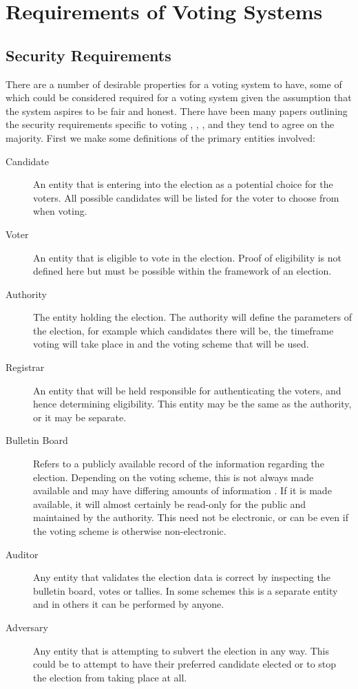 
\chapter{Requirements of Voting Systems}
\label{ch:req}

\section{Security Requirements}
\label{ch:req:sec}

There are a number of desirable properties for a voting system to have, some of which could be considered required for a voting system given the assumption that the system aspires to be fair and honest. There have been many papers outlining the security requirements specific to voting \cite{epstein_electronic_2007}, \cite{delaune_formalising_nodate}, \cite{li_taxonomy_2014}, and they tend to agree on the majority. First we make some definitions of the primary entities involved:

\begin{description}
    \item[Candidate] An entity that is entering into the election as a potential choice for the voters. All possible candidates will be listed for the voter to choose from when voting.
    \item[Voter] An entity that is eligible to vote in the election. Proof of eligibility is not defined here but must be possible within the framework of an election.
    \item[Authority] The entity holding the election. The authority will define the parameters of the election, for example which candidates there will be, the timeframe voting will take place in and the voting scheme that will be used.
    \item[Registrar] An entity that will be held responsible for authenticating the voters, and hence determining eligibility. This entity may be the same as the authority, or it may be separate.
    \item[Bulletin Board] Refers to a publicly available record of the information regarding the election. Depending on the voting scheme, this is not always made available and may have differing amounts of information . If it is made available, it will almost certainly be read-only for the public and maintained by the authority. This need not be electronic, or can be even if the voting scheme is otherwise non-electronic.
    \item[Auditor] Any entity that validates the election data is correct by inspecting the bulletin board, votes or tallies. In some schemes this is a separate entity  and in others  it can be performed by anyone.
    \item[Adversary] Any entity that is attempting to subvert the election in any way. This could be to attempt to have their preferred candidate elected or to stop the election from taking place at all.
\end{description}

